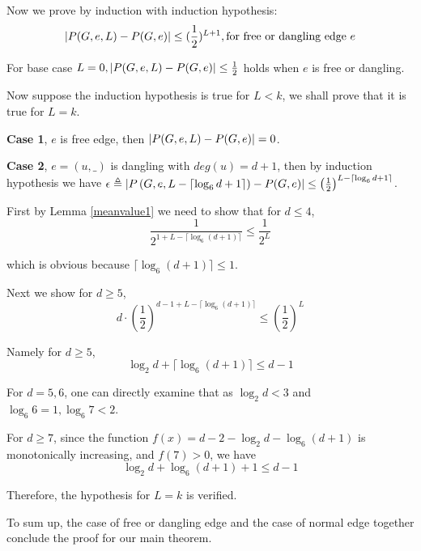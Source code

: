		Now we prove by induction with induction hypothesis:
		\[\left\vert P(G,e,L) - P(G,e)\right\vert \leq (\frac{1}{2})^{L+1}, \textrm{for free or dangling edge $e$}\]
		
		For base case $L=0, \left\vert P(G,e,L) - P(G,e)\right\vert \leq \frac{1}{2}$ holds when $e$ is free or dangling.

		Now suppose the induction hypothesis is true for $L<k$, we shall prove that it is true for $L=k$.

		{\bf Case 1}, $e$ is free edge, then $\left\vert P(G,e,L) - P(G,e)\right\vert = 0$.

		{\bf Case 2}, $e=(u,\_)$ is dangling with $deg(u)=d+1$, then by induction hypothesis we have
		$\epsilon \triangleq \left\vert P\left(G,e,L-\lceil \log_6{d+1}\rceil \right) - P(G,e)\right\vert \leq \left(\frac{1}{2}\right)^{L-\lceil \log_6{d+1}\rceil}$.

		First by Lemma \ref{meanvalue1} we need to show that for $d \leq 4$,
		\[\frac{1}{2^{1+L-\lceil \log_6{(d+1)}\rceil}} \leq \frac{1}{2^L}\]

		which is obvious because $\lceil\log_6{(d+1)}\rceil \leq 1$.

		Next we show for $d \geq 5$,
		\[ d\cdot \left( \frac{1}{2} \right)^{d-1 + L - \lceil \log_6{(d+1)}\rceil}  \leq \left( \frac{1}{2} \right)^L \]

		Namely for $d \geq 5$,
		\[ \log_2 d + \lceil \log_6{(d+1)} \rceil \leq d-1\]

		For $d=5,6$, one can directly examine that as $\log_2 d < 3$ and $\log_6 6 =1, \log_6 7 < 2$.


		For $d\geq 7$, since the function $f(x) = d-2 -\log_2 d - \log_6{(d+1)}$ is monotonically increasing, and $f(7)>0$, we have
        \[ \log_2 d + \log_6{(d+1)} + 1 \leq d-1\]

%
%
%
%

		Therefore, the hypothesis for $L=k$ is verified.

		To sum up, the case of free or dangling edge and the case of normal edge together conclude the proof for our main theorem.
